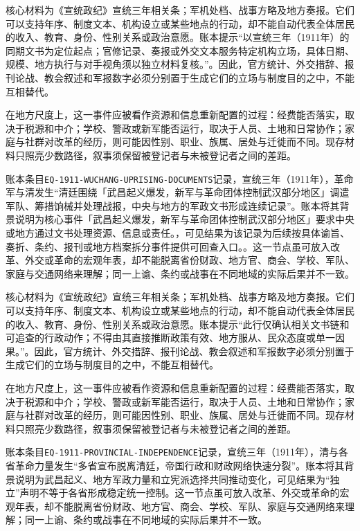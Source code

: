 核心材料为《宣统政纪》宣统三年相关条；军机处档、战事方略及地方奏报。它们可以支持年序、制度文本、机构设立或某些地点的行动，却不能自动代表全体居民的收入、教育、身份、性别关系或政治意愿。账本提示“以宣统三年（1911年）的同期文书为定位起点；官修记录、奏报或外交文本服务特定机构立场，具体日期、规模、地方执行与对手视角须以独立材料复核。”。因此，官方统计、外交措辞、报刊论战、教会叙述和军报数字必须分别置于生成它们的立场与制度目的之中，不能互相替代。

在地方尺度上，这一事件应被看作资源和信息重新配置的过程：经费能否落实，取决于税源和中介；学校、警政或新军能否运行，取决于人员、土地和日常协作；家庭与社群对改革的经历，则可能因性别、职业、族属、居处与迁徙而不同。现存材料只照亮少数路径，叙事须保留被登记者与未被登记者之间的差距。

账本条目\texttt{EQ-1911-WUCHANG-UPRISING-DOCUMENTS}记录，宣统三年（1911年），革命军与清发生“清廷围绕「武昌起义爆发，新军与革命团体控制武汉部分地区」调遣军队、筹措饷械并处理战报，中央与地方的军政文书形成连续记录”。账本将其背景说明为核心事件「武昌起义爆发，新军与革命团体控制武汉部分地区」要求中央或地方通过文书处理资源、信息或责任。，可见结果为该记录为后续按具体谕旨、奏折、条约、报刊或地方档案拆分事件提供可回查入口。。这一节点虽可放入改革、外交或革命的宏观年表，却不能脱离省份财政、地方官、商会、学校、军队、家庭与交通网络来理解；同一上谕、条约或战事在不同地域的实际后果并不一致。

核心材料为《宣统政纪》宣统三年相关条；军机处档、战事方略及地方奏报。它们可以支持年序、制度文本、机构设立或某些地点的行动，却不能自动代表全体居民的收入、教育、身份、性别关系或政治意愿。账本提示“此行仅确认相关文书链和可追查的行政动作；不得由其直接推断政策有效、地方服从、民众态度或单一因果。”。因此，官方统计、外交措辞、报刊论战、教会叙述和军报数字必须分别置于生成它们的立场与制度目的之中，不能互相替代。

在地方尺度上，这一事件应被看作资源和信息重新配置的过程：经费能否落实，取决于税源和中介；学校、警政或新军能否运行，取决于人员、土地和日常协作；家庭与社群对改革的经历，则可能因性别、职业、族属、居处与迁徙而不同。现存材料只照亮少数路径，叙事须保留被登记者与未被登记者之间的差距。

账本条目\texttt{EQ-1911-PROVINCIAL-INDEPENDENCE}记录，宣统三年（1911年），清与各省革命力量发生“多省宣布脱离清廷，帝国行政和财政网络快速分裂”。账本将其背景说明为武昌起义、地方军政力量和立宪派选择共同推动变化，可见结果为“独立”声明不等于各省形成稳定统一控制。这一节点虽可放入改革、外交或革命的宏观年表，却不能脱离省份财政、地方官、商会、学校、军队、家庭与交通网络来理解；同一上谕、条约或战事在不同地域的实际后果并不一致。


